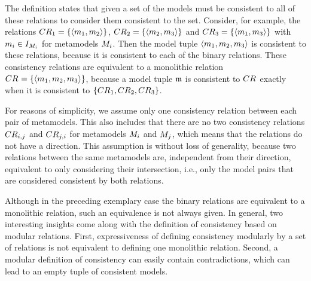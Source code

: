 The definition states that given a set of \modellevelconsistencyrelations the models must be consistent to all of these relations to consider them consistent to the set.
Consider, for example, the relations $\consistencyrelation{CR}{1} = \setted{\tupled{\model{m}{1}, \model{m}{2}}}$, $\consistencyrelation{CR}{2} = \setted{\tupled{\model{m}{2},\model{m}{3}}}$ and $\consistencyrelation{CR}{3} = \setted{\tupled{\model{m}{1}, \model{m}{3}}}$ with $\model{m}{i} \in \metamodelinstanceset{M}{i}$ for metamodels $\metamodel{M}{i}$. Then the model tuple $\tupled{\model{m}{1}, \model{m}{2}, \model{m}{3}}$ is consistent to these relations, because it is consistent to each of the binary relations.
These consistency relations are equivalent to a monolithic relation $\consistencyrelation{CR}{} = \setted{\tupled{\model{m}{1}, \model{m}{2}, \model{m}{3}}}$, because a model tuple $\modeltuple{m}$ is consistent to $\consistencyrelation{CR}{}$ exactly when it is consistent to $\setted{\consistencyrelation{CR}{1}, \consistencyrelation{CR}{2}, \consistencyrelation{CR}{3}}$.

For reasons of simplicity, we assume only one consistency relation between each pair of metamodels.
This also includes that there are no two consistency relations $\consistencyrelation{CR}{i,j}$ and $\consistencyrelation{CR}{j,i}$ for metamodels $\metamodel{M}{i}$ and $\metamodel{M}{j}$, which means that the relations do not have a direction.
This assumption is without loss of generality, because two relations between the same metamodels are, independent from their direction, equivalent to only considering their intersection, i.e., only the model pairs that are considered consistent by both relations.


Although in the preceding exemplary case the binary relations are equivalent to a monolithic relation, such an equivalence is not always given. In general, two interesting insights come along with the definition of consistency based on modular relations. First, expressiveness of defining consistency modularly by a set of relations is not equivalent to defining one monolithic relation. Second, a modular definition of consistency can easily contain contradictions, which can lead to an empty tuple of consistent models.

